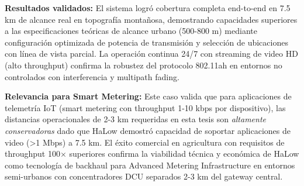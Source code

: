 \textbf{Resultados validados:} El sistema logró cobertura completa end-to-end en 7.5 km de alcance real en topografía montañosa, demostrando capacidades superiores a las especificaciones teóricas de alcance urbano (500-800 m) mediante configuración optimizada de potencia de transmisión y selección de ubicaciones con línea de vista parcial. La operación continua 24/7 con streaming de video HD (alto throughput) confirma la robustez del protocolo 802.11ah en entornos no controlados con interferencia y multipath fading.

\textbf{Relevancia para Smart Metering:} Este caso valida que para aplicaciones de telemetría IoT (smart metering con throughput 1-10 kbps por dispositivo), las distancias operacionales de 2-3 km requeridas en esta tesis son \textit{altamente conservadoras} dado que HaLow demostró capacidad de soportar aplicaciones de video (>1 Mbps) a 7.5 km. El éxito comercial en agricultura con requisitos de throughput 100$\times$ superiores confirma la viabilidad técnica y económica de HaLow como tecnología de backhaul para Advanced Metering Infrastructure en entornos semi-urbanos con concentradores DCU separados 2-3 km del gateway central.

